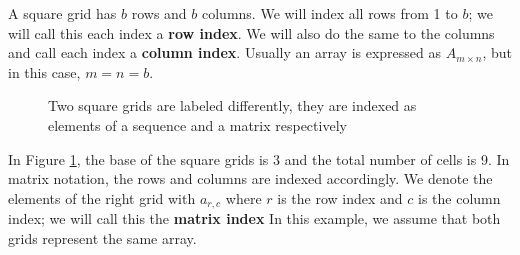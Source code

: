 \documentclass[twoside,openany,12pt]{book}
\begin{document}
    A square grid has $b$ rows and $b$ columns. We will index all rows from 1 to $b$; we will call this each index a \textbf{row index}. We will also do the same to the columns and call each index a \textbf{column index}. Usually an array is expressed as $A_{m \times n}$, but in this case, $m = n = b$.

    \clearpage

    \begin{figure}[h!]
        \centering
        \begin{minipage}{0.45\textwidth}
            \centering
        \end{minipage}
        \begin{minipage}{0.45\textwidth}
            \centering
        \end{minipage}

        \caption{Two square grids are labeled differently, they are indexed as elements of a sequence and a matrix respectively} \label{2forms1grid}
    \end{figure}

    In Figure \ref{2forms1grid}, the base of the square grids is 3 and the total number of cells is 9. In matrix notation, the rows and columns are indexed accordingly. We denote the elements of the right grid with $a_{r,c}$ where $r$ is the row index and $c$ is the column index; we will call this the \textbf{matrix index} In this example, we assume that both grids represent the same array.
\end{document}
